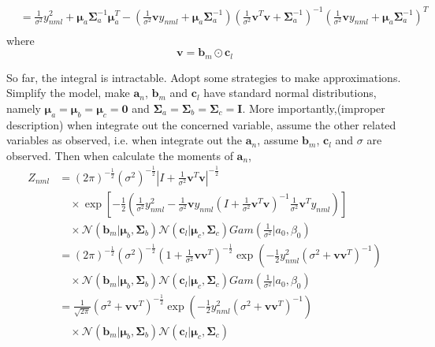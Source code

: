 \documentclass{article}
\newcommand{\bs}[1]{\boldsymbol{#1}}
\newcommand{\gs}[3]{\mathcal{N}(#1|#2,#3)}
\begin{document}
\begin{flushleft}
\begin{equation}
\begin{split}
		& = \frac{1}{\sigma^2} y_{nml}^2 + \bs{\mu}_a \bs{\Sigma}_a^{-1} \bs{\mu}_a^T - (\frac{1}{\sigma^2}\bs{v}y_{nml} + \bs{\mu}_a \bs{\Sigma}_a^{-1})(\frac{1}{\sigma^2}\bs{v}^T \bs{v} + \bs{\Sigma}_a^{-1})^{-1} (\frac{1}{\sigma^2}\bs{v}y_{nml} + \bs{\mu}_a \bs{\Sigma}_a^{-1})^T\\
	\end{split}
\end{equation}
where 
\begin{equation}
	\bs{v} = \bs{b}_m \odot \bs{c}_l
\end{equation}


So far, the integral is intractable. Adopt some strategies to make approximations. Simplify the model, make $\bs{a}_n$, $\bs{b}_m$ and $\bs{c}_l$ have standard normal distributions, namely $\bs{\mu}_a = \bs{\mu}_b = \bs{\mu}_c =\bs{0}$ and $\bs{\Sigma}_a=\bs{\Sigma}_b=\bs{\Sigma}_c=\bs{I}$. More importantly,(improper description) when integrate out the concerned variable, assume the other related variables as observed, i.e. when integrate out the $\bs{a}_n$, assume $\bs{b}_m$, $\bs{c}_l$ and $\sigma$ are observed.
Then when calculate the moments of $\bs{a}_n$,
\begin{equation}
	\begin{split}
	Z_{nml} & = (2\pi)^{-\frac{1}{2}}(\sigma^2)^{-\frac{1}{2}}|I + \frac{1}{\sigma^2}\bs{v}^T\bs{v}|^{-\frac{1}{2}}\\
	& \quad \times \exp \left[ -\frac{1}{2} \left( \frac{1}{\sigma^2} y_{nml}^2 - \frac{1}{\sigma^2}\bs{v}y_{nml}(I + \frac{1}{\sigma^2}\bs{v}^T\bs{v})^{-1} \frac{1}{\sigma^2}\bs{v}^Ty_{nml} \right) \right]\\
	& \quad \times \gs{\bs{b}_m}{\bs{\mu}_b}{\bs{\Sigma}_b}
                 \gs{\bs{c}_l}{\bs{\mu}_c}{\bs{\Sigma}_c}
                 Gam(\frac{1}{\sigma^2} | a_0, \beta_0)\\
	& = (2\pi)^{-\frac{1}{2}} (\sigma^2)^{-\frac{1}{2}} (1 + \frac{1}{\sigma^2}\bs{v} \bs{v}^T )^{-\frac{1}{2}} \exp (-\frac{1}{2} y_{nml}^2 (\sigma^2 + \bs{v} \bs{v}^T)^{-1})\\
	& \quad \times \gs{\bs{b}_m}{\bs{\mu}_b}{\bs{\Sigma}_b}
                 \gs{\bs{c}_l}{\bs{\mu}_c}{\bs{\Sigma}_c}
                 Gam(\frac{1}{\sigma^2} | a_0, \beta_0)\\
	& = \frac{1}{\sqrt{2\pi}}(\sigma^2 + \bs{v} \bs{v}^T)^{-\frac{1}{2}} \exp (-\frac{1}{2}y_{nml}^2 (\sigma^2 + \bs{v} \bs{v}^T)^{-1}) \\
	& \quad \times \gs{\bs{b}_m}{\bs{\mu}_b}{\bs{\Sigma}_b}
                 \gs{\bs{c}_l}{\bs{\mu}_c}{\bs{\Sigma}_c}

\end{split}
\end{equation}
\end{flushleft}
\end{document}
